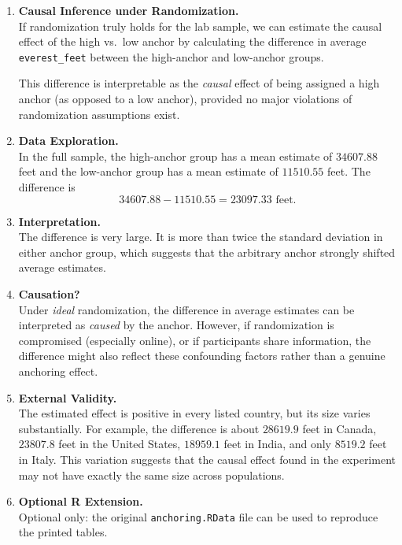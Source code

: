 \documentclass[12pt]{article}
\begin{document}
\begin{enumerate}
  \item \textbf{Causal Inference under Randomization.}\\
  If randomization truly holds for the lab sample, we can estimate the causal effect of the high vs.\ low anchor by calculating the difference in average \texttt{everest\_feet} between the high-anchor and low-anchor groups.
  
  This difference is interpretable as the \emph{causal} effect of being assigned a high anchor (as opposed to a low anchor), provided no major violations of randomization assumptions exist.

  \item \textbf{Data Exploration.}\\
  In the full sample, the high-anchor group has a mean estimate of \(34607.88\) feet and the low-anchor group has a mean estimate of \(11510.55\) feet. The difference is
  \[
    34607.88 - 11510.55 = 23097.33 \text{ feet}.
  \]

  \item \textbf{Interpretation.}\\
  The difference is very large. It is more than twice the standard deviation in either anchor group, which suggests that the arbitrary anchor strongly shifted average estimates.

  \item \textbf{Causation?}\\
  Under \emph{ideal} randomization, the difference in average estimates can be interpreted as \emph{caused} by the anchor. However, if randomization is compromised (especially online), or if participants share information, the difference might also reflect these confounding factors rather than a genuine anchoring effect.

  \item \textbf{External Validity.}\\
  The estimated effect is positive in every listed country, but its size varies substantially. For example, the difference is about \(28619.9\) feet in Canada, \(23807.8\) feet in the United States, \(18959.1\) feet in India, and only \(8519.2\) feet in Italy. This variation suggests that the causal effect found in the experiment may not have exactly the same size across populations.

  \item \textbf{Optional R Extension.}\\
  Optional only: the original \texttt{anchoring.RData} file can be used to reproduce the printed tables.
\end{enumerate}
\end{document}
